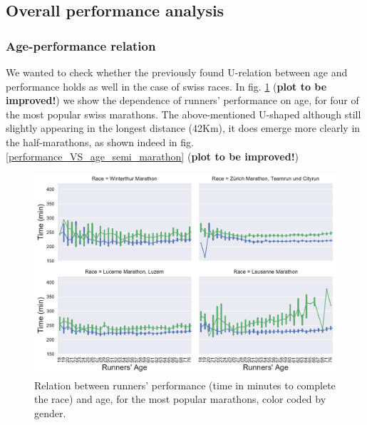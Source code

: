 \documentclass[fleqn,10pt]{wlscirep}
\begin{document}
	
	\subsection*{Overall performance analysis}
	
		\subsubsection*{Age-performance relation}
		
		
			We wanted to check whether the previously found	\cite{connick2015relative,knechtle2014relationship,lara2014relationship,lehto2016effects}
			U-relation between age and performance holds as well in the case of swiss races. 
			In fig. \ref{performance_VS_age_marathon} 
			(\textbf{plot to be improved!}) 
			we show the dependence of runners' performance on age, for four of the most popular swiss marathons. 
			The above-mentioned U-shaped although still slightly appearing in the longest distance (42Km), it does emerge more clearly in the half-marathons, as  shown indeed in fig. \ref{performance_VS_age_semi_marathon}
			(\textbf{plot to be improved!}) 
			
			
			\begin{figure}[h]	
		
				\centering
				
				\includegraphics[scale=0.6]{../data_analysis/plots_for_paper/performance_VS_age_marathon.pdf}
				
				
				\caption{Relation between runners' performance (time in minutes to complete the race) and age, for the most popular marathons, color coded by gender.}
				
				\label{performance_VS_age_marathon}
		
			\end{figure}								
		
\end{document}
